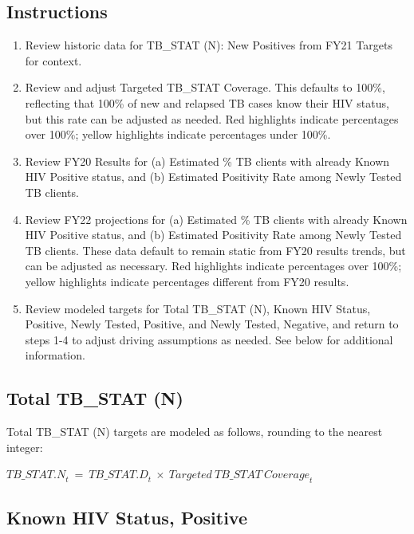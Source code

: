 \documentclass[
  openany]{book}
\begin{document}
\hypertarget{instructions-18}{%
\subsection{Instructions}\label{instructions-18}}

\begin{enumerate}
\def\labelenumi{\arabic{enumi}.}
\item
  Review historic data for TB\_STAT (N): New Positives from FY21
  Targets for context.
\item
  Review and adjust Targeted TB\_STAT Coverage. This defaults to 100\%,
  reflecting that 100\% of new and relapsed TB cases know their HIV
  status, but this rate can be adjusted as needed. Red highlights
  indicate percentages over 100\%; yellow highlights indicate
  percentages under 100\%.
\item
  Review FY20 Results for (a) Estimated \% TB clients with already
  Known HIV Positive status, and (b) Estimated Positivity Rate among
  Newly Tested TB clients.
\item
  Review FY22 projections for (a) Estimated \% TB clients with already
  Known HIV Positive status, and (b) Estimated Positivity Rate among
  Newly Tested TB clients. These data default to remain static from
  FY20 results trends, but can be adjusted as necessary. Red
  highlights indicate percentages over 100\%; yellow highlights
  indicate percentages different from FY20 results.
\item
  Review modeled targets for Total TB\_STAT (N), Known HIV Status,
  Positive, Newly Tested, Positive, and Newly Tested, Negative, and
  return to steps 1-4 to adjust driving assumptions as needed. See
  below for additional information.
\end{enumerate}

\hypertarget{total-tb_stat-n}{%
\subsection{Total TB\_STAT (N)}\label{total-tb_stat-n}}

Total TB\_STAT (N) targets are modeled as follows, rounding to the
nearest integer:

\begin{center} ${TB\_ STAT.N}_{t}\  = \ {TB\_ STAT.D}_{t}\  \times \ {Targeted\ TB\_ STAT\ Coverage}_{t}$ \end{center}

\hypertarget{known-hiv-status-positive}{%
\subsection{Known HIV Status, Positive}\label{known-hiv-status-positive}}
\end{document}
